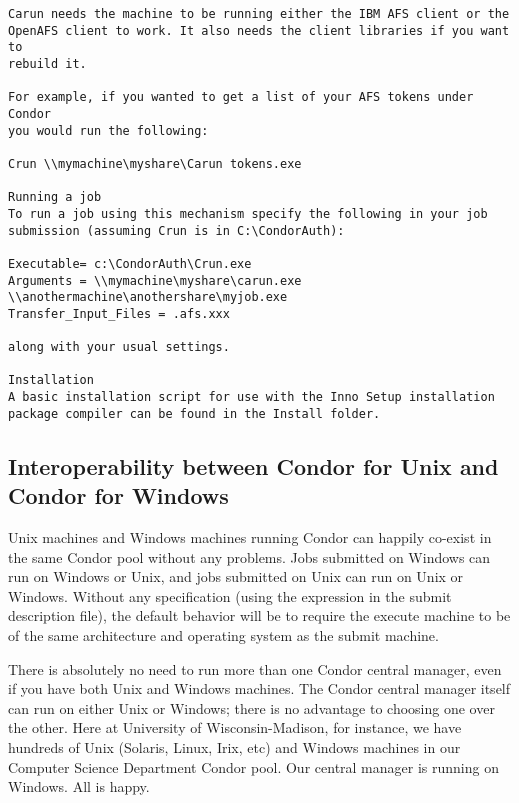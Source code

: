 \begin{verbatim}
Carun needs the machine to be running either the IBM AFS client or the 
OpenAFS client to work. It also needs the client libraries if you want to 
rebuild it.

For example, if you wanted to get a list of your AFS tokens under Condor 
you would run the following:

Crun \\mymachine\myshare\Carun tokens.exe

Running a job
To run a job using this mechanism specify the following in your job 
submission (assuming Crun is in C:\CondorAuth):

Executable= c:\CondorAuth\Crun.exe
Arguments = \\mymachine\myshare\carun.exe 
\\anothermachine\anothershare\myjob.exe
Transfer_Input_Files = .afs.xxx

along with your usual settings.

Installation
A basic installation script for use with the Inno Setup installation 
package compiler can be found in the Install folder.
\end{verbatim}




\subsection{Interoperability between Condor for Unix and Condor for Windows}

Unix machines and Windows machines running Condor can happily
co-exist in the same Condor pool without any problems.
Jobs submitted on Windows can run on Windows or Unix,
and jobs submitted on Unix can run on Unix or Windows.
Without any specification
(using the  expression in the submit description file),
the default behavior will be to 
require the execute machine to be of the same architecture and operating
system as the submit machine.

There is absolutely no need to run more than one Condor central manager,
even if you have both Unix and Windows machines.  The Condor central manager
itself can run on either Unix or Windows; there is no advantage to choosing
one over the other.  Here at University of Wisconsin-Madison, for
instance, we have hundreds of Unix (Solaris, Linux, Irix, etc) and
Windows machines in our Computer Science Department Condor pool.
Our central manager is running on Windows.  All is happy.

